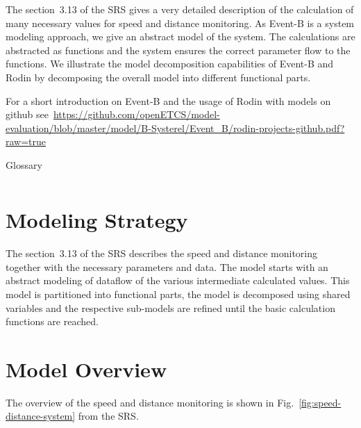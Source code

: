 \documentclass{template/openetcs_article}
\begin{document}
The section~3.13 of the SRS gives a very detailed description of the calculation
of many necessary values for speed and distance monitoring. As Event-B is a
system modeling approach, we give an abstract model of the system. The
calculations are abstracted as functions and the system ensures the correct
parameter flow to the functions. We illustrate the model decomposition
capabilities of Event-B and Rodin by decomposing the overall model into
different functional parts.

For a short introduction on Event-B and the usage of Rodin with models on github
see~\url{https://github.com/openETCS/model-evaluation/blob/master/model/B-Systerel/Event_B/rodin-projects-github.pdf?raw=true}

\begin{table}[ht]
  \centering
  \begin{tabular}[ht]{|l|l|}
    \hline
     &  \\
    \hline
  \end{tabular}
  \caption{Glossary}
  \label{tab:glossary}
\end{table}

\section{Modeling Strategy}
\label{sec:modeling-strategy}

The section~3.13 of the SRS describes the speed and distance monitoring together
with the necessary parameters and data. The model starts with an abstract
modeling of dataflow of the various intermediate calculated values. This model
is partitioned into functional parts, the model is decomposed using shared
variables and the respective sub-models are refined until the basic calculation
functions are reached.

\section{Model Overview}
\label{sec:model-overview}

The overview of the speed and distance monitoring is shown in
Fig.~\ref{fig:speed-distance-system} from the SRS.
\end{document}
